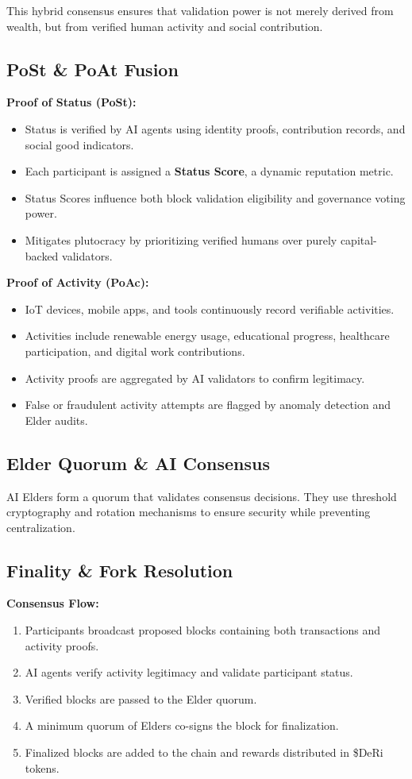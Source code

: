 \documentclass[11pt,a4paper]{article}
\begin{document}
This hybrid consensus ensures that validation power is not merely derived from wealth, but from verified human activity and social contribution.

\subsection{PoSt \& PoAt Fusion}
\textbf{Proof of Status (PoSt):}
\begin{itemize}
    \item Status is verified by AI agents using identity proofs, contribution records, and social good indicators.
    \item Each participant is assigned a \textbf{Status Score}, a dynamic reputation metric.
    \item Status Scores influence both block validation eligibility and governance voting power.
    \item Mitigates plutocracy by prioritizing verified humans over purely capital-backed validators.
\end{itemize}

\textbf{Proof of Activity (PoAc):}
\begin{itemize}
    \item IoT devices, mobile apps, and tools continuously record verifiable activities.
    \item Activities include renewable energy usage, educational progress, healthcare participation, and digital work contributions.
    \item Activity proofs are aggregated by AI validators to confirm legitimacy.
    \item False or fraudulent activity attempts are flagged by anomaly detection and Elder audits.
\end{itemize}

\subsection{Elder Quorum \& AI Consensus}
AI Elders form a quorum that validates consensus decisions. They use threshold cryptography and rotation mechanisms to ensure security while preventing centralization.

\subsection{Finality \& Fork Resolution}
\textbf{Consensus Flow:}
\begin{enumerate}
    \item Participants broadcast proposed blocks containing both transactions and activity proofs.
    \item AI agents verify activity legitimacy and validate participant status.
    \item Verified blocks are passed to the Elder quorum.
    \item A minimum quorum of Elders co-signs the block for finalization.
    \item Finalized blocks are added to the chain and rewards distributed in \$DeRi tokens.
\end{enumerate}
\end{document}
